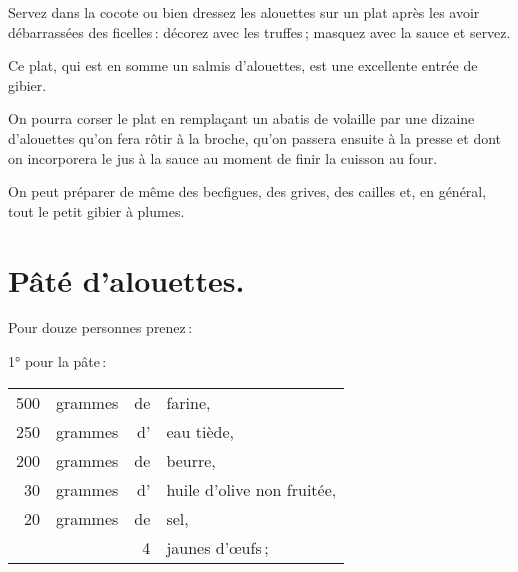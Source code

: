 Servez dans la cocote ou bien dressez les alouettes sur un plat après les avoir
débarrassées des ficelles : décorez avec les truffes ; masquez avec la sauce et
servez.

Ce plat, qui est en somme un salmis d'alouettes, est une excellente entrée de
gibier.

\sk

On pourra corser le plat en remplaçant un abatis de volaille par une dizaine
d'alouettes qu'on fera rôtir à la broche, qu'on passera ensuite à la presse et
dont on incorporera le jus à la sauce au moment de finir la cuisson au four.

\sk

On peut préparer de même des becfigues, des grives, des cailles et, en général,
tout le petit gibier à plumes.

\section*{\centering Pâté d'alouettes.}
{}

Pour douze personnes prenez :

\medskip

1° pour la pâte :

\footnotesize
\begin{longtable}{rrrp{16em}}
    500 & grammes & de & farine,                                                                          \\
    250 & grammes & d' & eau tiède,                                                                       \\
    200 & grammes & de & beurre,                                                                          \\
     30 & grammes & d' & huile d'olive non fruitée,                                                       \\
     20 & grammes & de & sel,                                                                             \\
        &         &  4 & jaunes d'œufs ;                                                                  \\
\end{longtable}
\normalsize


